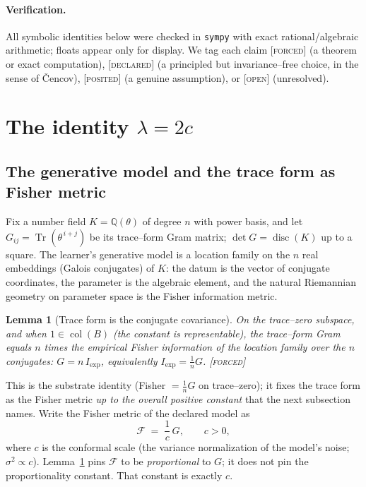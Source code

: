 \documentclass[11pt]{article}
\theoremstyle{plain}
\newtheorem{lemma}[theorem]{Lemma}
\theoremstyle{definition}
\theoremstyle{remark}
\newcommand{\forced}{\textcolor{forcedc}{\textsc{[forced]}}}
\newcommand{\declared}{\textcolor{declaredc}{\textsc{[declared]}}}
\newcommand{\posited}{\textcolor{positedc}{\textsc{[posited]}}}
\newcommand{\openq}{\textcolor{openc}{\textsc{[open]}}}
\newcommand{\Q}{\mathbb{Q}}
\newcommand{\tr}{\operatorname{Tr}}
\begin{document}
\paragraph{Verification.} All symbolic identities below were checked in \texttt{sympy} with exact rational/algebraic arithmetic; floats appear only for display. We tag each claim \forced{} (a theorem or exact computation), \declared{} (a principled but invariance--free choice, in the sense of \v{C}encov), \posited{} (a genuine assumption), or \openq{} (unresolved).

\section{The identity \texorpdfstring{$\lambda=2c$}{lambda = 2c}}\label{sec:identity}

\subsection{The generative model and the trace form as Fisher metric}

Fix a number field $K=\Q(\theta)$ of degree $n$ with power basis, and let $G_{ij}=\tr(\theta^{\,i+j})$ be its trace--form Gram matrix; $\det G = \operatorname{disc}(K)$ up to a square. The learner's generative model is a location family on the $n$ real embeddings (Galois conjugates) of $K$: the datum is the vector of conjugate coordinates, the parameter is the algebraic element, and the natural Riemannian geometry on parameter space is the Fisher information metric.

\begin{lemma}[Trace form is the conjugate covariance]\label{lem:fisher}
On the trace--zero subspace, and when $1\in\operatorname{col}(B)$ (the constant is representable), the trace--form Gram equals $n$ times the empirical Fisher information of the location family over the $n$ conjugates: $G = n\, I_{\exp}$, equivalently $I_{\exp}=\tfrac1n G$. \forced
\end{lemma}

This is the substrate identity (Fisher $=\tfrac1n G$ on trace--zero); it fixes the trace form as the Fisher metric \emph{up to the overall positive constant} that the next subsection names. Write the Fisher metric of the declared model as
\begin{equation}\label{eq:fisherc}
\mathcal F \;=\; \frac1c\, G, \qquad c>0,
\end{equation}
where $c$ is the conformal scale (the variance normalization of the model's noise; $\sigma^2 \propto c$). Lemma~\ref{lem:fisher} pins $\mathcal F$ to be \emph{proportional} to $G$; it does not pin the proportionality constant. That constant is exactly $c$.
\end{document}
